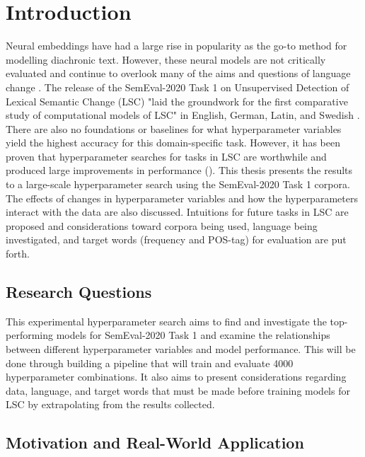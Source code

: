 

\section{Introduction}
\label{sec:intro}

Neural embeddings have had a large rise in popularity as the go-to method for modelling diachronic text. However, these neural models are not critically evaluated and continue to overlook many of the aims and questions of language change \citep{hengchen2021challenges}. The release of the SemEval-2020 Task 1 on Unsupervised Detection of Lexical Semantic Change (LSC) \citep{schlechtweg-etal-2020-semeval} "laid the groundwork for the first comparative study of computational models of LSC" in English, German, Latin, and Swedish \citep{hengchen2021SBXrushifteval}. There are also no foundations or baselines for what hyperparameter variables yield the highest accuracy for this domain-specific task. However, it has been proven that hyperparameter searches for tasks in LSC are worthwhile and produced large improvements in performance (\citet{kaiser-etal-2020-ims, hengchen2021SBXrushifteval}). This thesis presents the results to a large-scale hyperparameter search using the SemEval-2020 Task 1 corpora. The effects of changes in hyperparameter variables and how the hyperparameters interact with the data are also discussed. Intuitions for future tasks in LSC are proposed and considerations toward corpora being used, language being investigated, and target words (frequency and POS-tag) for evaluation are put forth. 


\subsection{Research Questions}
This experimental hyperparameter search aims to find and investigate the top-performing models for SemEval-2020 Task 1 and examine the relationships between different hyperparameter variables and model performance. This will be done through building a pipeline that will train and evaluate 4000 hyperparameter combinations. It also aims to present considerations regarding data, language, and target words that must be made before training models for LSC by extrapolating from the results collected. 


\subsection{Motivation and Real-World Application}

